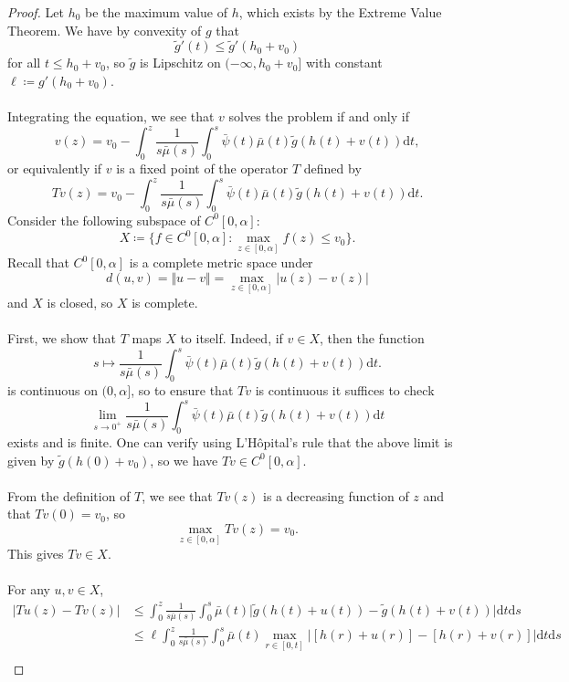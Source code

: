 \documentclass{article}
\begin{document}
    \begin{proof}
        Let $h_0$ be the maximum value of $h$, which exists by the Extreme Value Theorem.
        We have by convexity of $g$ that
        \[\tilde g'(t) \leq \tilde g'(h_0 + v_0)\]
        for all $t \leq h_0 + v_0$, so $\tilde g$ is Lipschitz on $(-\infty, h_0 + v_0]$ with constant $\ell \coloneqq g'(h_0 + v_0)$. \\ \\
        Integrating the equation, we see that $v$ solves the problem if and only if
        \[v(z) = v_0 - \int_0^z \frac 1{s\bar\mu(s)}\int_0^s \bar\psi(t)\bar\mu(t) \tilde g(h(t)+v(t))\mathrm{d}t ,\]
        or equivalently if $v$ is a fixed point of the operator $T$ defined by
        \[Tv(z) = v_0 - \int_0^z \frac 1{s\bar\mu(s)}\int_0^s \bar\psi(t)\bar\mu(t) \tilde g(h(t)+v(t))\mathrm{d}t .\]
        Consider the following subspace of $C^0[0,\alpha]$:
        \[X\coloneqq \{f\in C^0[0,\alpha]: \max_{z\in[0,\alpha]}f(z) \leq v_0\}.\]
        Recall that $C^0[0,\alpha]$ is a complete metric space under 
        \[d(u,v) =\Vert{u-v}\Vert=\max_{z\in[0,\alpha]}|u(z) - v(z)|\]
        and $X$ is closed, so $X$ is complete. \\ \\
        First, we show that $T$ maps $X$ to itself. Indeed, if $v\in X$, then the function
        \[s\mapsto \frac 1{s\bar\mu(s)}\int_0^s \bar\psi(t)\bar\mu(t)\tilde g(h(t)+v(t))\mathrm{d}t .\]
        is continuous on $(0,\alpha]$, so to ensure that $Tv$ is continuous it suffices to check 
        \[\lim_{s\to 0^+}\frac 1{s\bar\mu(s)}\int_0^s \bar\psi(t)\bar\mu(t)\tilde g(h(t) + v(t))\mathrm{d}t\] exists and is finite. One can verify using L'Hôpital's rule that the above limit is given by $\tilde g(h(0) + v_0)$, so we have $Tv\in C^0[0,\alpha]$. \\ \\
        From the definition of $T$, we see that $Tv(z)$ is a decreasing function of $z$ and that $Tv(0) = v_0$, so
        \[\max_{z\in[0,\alpha]}Tv(z) = v_0.\]
        This gives $Tv\in X$. \\ \\
        For any $u,v\in X$,
        \begin{align*}
            |Tu(z) - Tv(z)| &\leq \int_0^z \frac 1{s\bar\mu(s)}\int_0^s \bar\mu(t) \bigl|\tilde g(h(t) + u(t)) - \tilde g(h(t)+v(t))\bigr|\mathrm{d}t \mathrm{d}s \\
            &\leq \ell\int_0^z \frac 1{s\bar\mu(s)}\int_0^s \bar\mu(t)\max_{r\in[0,t]}\bigl|[h(r) + u(r)] - [h(r) + v(r)]\bigr|\mathrm{d}t \mathrm{d}s \\

\end{align*}
\end{proof}
\end{document}
